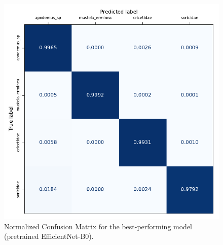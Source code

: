     

    \begin{figure}[ht]
    \centering
    \includegraphics{figures/conf_matrix_best.pdf}
    \caption{Normalized Confusion Matrix for the best-performing model (pretrained EfficientNet-B0).}
    \label{fig:conf_matrix_best}
    \end{figure}
